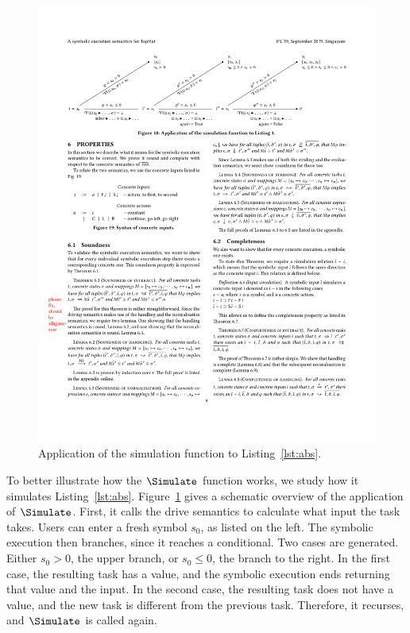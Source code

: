 \begin{figure}[t]
  \small
\includegraphics{figures/simulation}
\caption{Application of the simulation function to Listing~\ref{lst:abs}.}
\label{diagram:simapp}
\end{figure}

To better illustrate how the $\Simulate$ function works, we study how it simulates Listing~\ref{lst:abs}.
Figure~\ref{diagram:simapp} gives a schematic overview of the application of $\Simulate$.
First, it calls the drive semantics to calculate what input the task takes.
Users can enter a fresh symbol $s_0$, as listed on the left.
The symbolic execution then branches, since it reaches a conditional.
Two cases are generated. Either $s_0>0$, the upper branch, or $s_0\leq0$, the  branch to the right.
In the first case, the resulting task has a value, and the symbolic execution ends returning that value and the input.
In the second case, the resulting task does not have a value, and the new task is different from the previous task.
Therefore, it recurses, and $\Simulate$ is called again.

